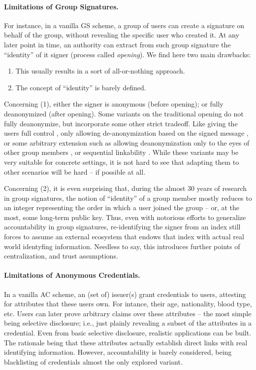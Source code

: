 \paragraph{Limitations of Group Signatures.} %
For instance, in a vanilla GS scheme, a group of users can create a signature on
behalf of the group, without revealing the specific user who created it. At any
later point in time, an authority can extract from such group signature the
``identity'' of it signer (process called \emph{opening}). We find here two main
drawbacks:

\begin{enumerate}
\item This usually results in a sort of all-or-nothing approach. 
\item The concept of ``identity'' is barely defined.
\end{enumerate}

Concerning (1), either the signer is anonymous (before opening); or fully
deanonymized (after opening). Some variants on the traditional opening do not
fully deanonymize, but incorporate some other strict tradeoff. Like giving the
users full control \cite{dl21}, only allowing de-anonymization based on the
signed message \cite{ehk+19}, or some
arbitrary extension such as allowing deanonymization only to the eyes of other
group members \cite{manu06}, or sequential linkability \cite{dl21}. While these
variants may be very suitable for concrete settings, it is not hard to see that
adapting them to other scenarios will be hard -- if possible at all.

Concerning (2), it is even surprising that, during the almost 30 years of
research in group signatures, the notion of ``identity'' of a group member
mostly reduces to an integer representing the order in which a user joined
the group -- or, at the most, some long-term public key. Thus, even with
notorious efforts to generalize accountability in group signatures,
re-identifying the signer from an index still forces to assume an external
ecosystem that endows that index with actual real world identyfing information.
Needless to say, this introduces further points of centralization, and
trust assumptions.

\paragraph{Limitations of Anonymous Credentials.} %
In a vanilla AC scheme, an (set of) issuer(s) grant credentials to users,
attesting for attributes that these users own. For intance, their age,
nationality, blood type, etc. Users can later prove arbitrary claims over
these attributes -- the most simple being selective disclosure; i.e., just
plainly revealing a subset of the attributes in a credential. Even from basic
selective disclosure, realistic applications can be built. The rationale being
that these attributes actually establish direct links with real identifying
information. However, accountability is barely considered, being blacklisting
of credentials almost the only explored variant.

